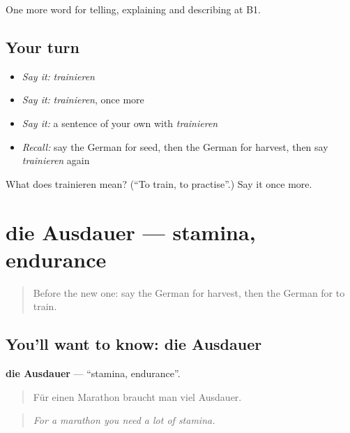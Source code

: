 \begin{grammarlens}[title={What you've built}]
One more word for telling, explaining and describing at B1.
\end{grammarlens}

\subsection*{Your turn}
\begin{itemize}
\raggedright
  \item \emph{Say it:} \emph{trainieren}
  \item \emph{Say it:} \emph{trainieren}, once more
  \item \emph{Say it:} a sentence of your own with \emph{trainieren}
  \item \emph{Recall:} say the German for seed, then the German for harvest, then say \emph{trainieren} again
\end{itemize}

\begin{tcolorbox}[breakable,colback=teal!4,colframe=teal!35!black,title={Before you move on}]
What does trainieren mean? (\textquotedblleft{}To train, to practise\textquotedblright{}.) Say it once more.
\end{tcolorbox}
\section[die Ausdauer]{die Ausdauer — stamina, endurance}

\label{lesson:GE-C505-ausdauer}



\begin{quote}
Before the new one: say the German for harvest, then the German for to train.
\end{quote}

\subsection*{You'll want to know: die Ausdauer}
\textbf{die Ausdauer} — \textquotedblleft{}stamina, endurance\textquotedblright{}.

\begin{quote}
Für einen Marathon braucht man viel Ausdauer.
\end{quote}

\begin{quote}
\emph{For a marathon you need a lot of stamina.}
\end{quote}

